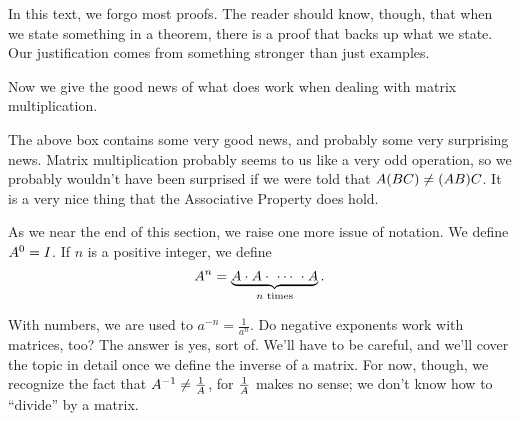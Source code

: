 In this text, we forgo most proofs. The reader should know, though, that when we state something in a theorem, there is a proof that backs up what we state. Our justification comes from something stronger than just examples.

Now we give the good news of what does work when dealing with matrix multiplication.


The above box contains some very good news, and probably some very surprising news. Matrix multiplication probably seems to us like a very odd operation, so we probably wouldn't have been surprised if we were told that $A(BC)\neq(AB)C$. It is a very nice thing that the Associative Property does hold.

As we near the end of this section, we raise one more issue of notation. We define $A^0 = I$. If $n$ is a positive integer, we define $$\tta^n = \underbrace{\tta\cdot\tta\cdot \ \cdots\ \cdot\tta}_\text{\parbox{50pt}{\centering $n$ times}}.$$ 

With numbers, we are used to $a^{-n} = \frac{1}{a^n}$. Do negative exponents work with matrices, too? The answer is yes, sort of. We'll have to be careful, and we'll cover the topic in detail once we define the inverse of a matrix. For now, though, we recognize the fact that $A^{-1} \neq \frac{1}{A}$, for $\frac{1}{A}$ makes no sense; we don't know how to ``divide'' by a matrix.\\

